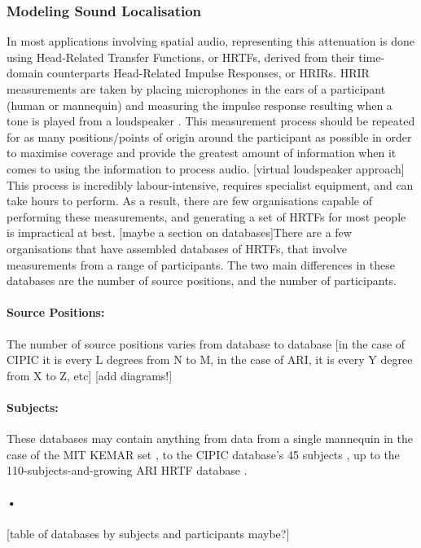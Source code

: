 \subsubsection{Modeling Sound Localisation}
In most applications involving spatial audio, representing this attenuation is done using Head-Related Transfer Functions, or HRTFs, derived from their time-domain counterparts Head-Related Impulse Responses, or HRIRs. HRIR measurements are taken by placing microphones in the ears of a participant (human or mannequin) and measuring the impulse response resulting when a tone is played from a loudspeaker \citep{who did this first?}. This measurement process should be repeated for as many positions/points of origin around the participant as possible in order to maximise coverage and provide the greatest amount of information when it comes to using the information to process audio. [virtual loudspeaker approach] This process is incredibly labour-intensive, requires specialist equipment, and can take hours to perform. As a result, there are few organisations capable of performing these measurements, and generating a set of HRTFs for most people is impractical at best. [maybe a section on databases]There are a few organisations that have assembled databases of HRTFs, that involve measurements from a range of participants. The two main differences in these databases are the number of source positions, and the number of participants. 

\paragraph{Source Positions:}The number of source positions varies from database to database [in the case of CIPIC it is every L degrees from N to M, in the case of ARI, it is every Y degree from X to Z, etc]
[add diagrams!]

\paragraph{Subjects:}
These databases may contain anything from data from a single mannequin in the case of the MIT KEMAR set \citep{Gardner1994}, to the CIPIC database's 45 subjects \citep{Algazi2001}, up to the 110-subjects-and-growing ARI HRTF database \citep{AcousticsResearchInstitute}. 

\paragraph{•}
[table of databases by subjects and participants maybe?]

